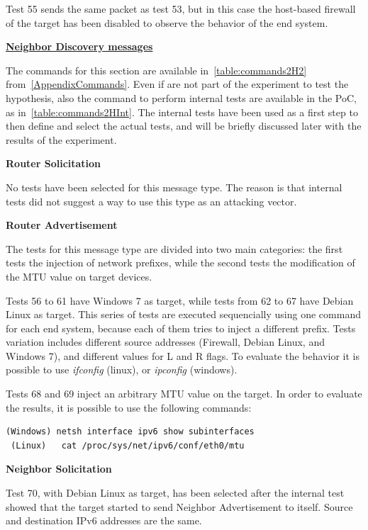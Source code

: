 \documentclass[12pt]{article}
\begin{document}
Test 55 sends the same packet as test 53, but in this case the host-based firewall of the target has been disabled to observe the behavior of the end system.


\textbf{\underline{Neighbor Discovery messages}}

The commands for this section are available in~\cref{table:commands2H2} from~\cref{AppendixCommands}. Even if are not part of the experiment to test the hypothesis, also the command to perform internal tests are available in the PoC, as in~\cref{table:commands2HInt}. The internal tests have been used as a first step to then define and select the actual tests, and will be briefly discussed later with the results of the experiment.

\textbf{Router Solicitation}

No tests have been selected for this message type. The reason is that internal tests did not suggest a way to use this type as an attacking vector.

\textbf{Router Advertisement}

The tests for this message type are divided into two main categories: the first tests the injection of network prefixes, while the second tests the modification of the MTU value on target devices. 

Tests 56 to 61 have Windows 7 as target, while tests from 62 to 67 have Debian Linux as target. This series of tests are executed sequencially using one command for each end system, because each of them tries to inject a different prefix. Tests variation includes different source addresses (Firewall, Debian Linux, and Windows 7), and different values for L and R flags. To evaluate the behavior it is possible to use \textit{ifconfig} (linux), or \textit{ipconfig} (windows).

Tests 68 and 69 inject an arbitrary MTU value on the target. In order to evaluate the results, it is possible to use the following commands:
\begin{lstlisting}[style=python,basicstyle=\ttfamily\small]
 (Windows) netsh interface ipv6 show subinterfaces
 (Linux)   cat /proc/sys/net/ipv6/conf/eth0/mtu
\end{lstlisting}


\textbf{Neighbor Solicitation}

Test 70, with Debian Linux as target, has been selected after the internal test showed that the target started to send Neighbor Advertisement to itself. Source and destination IPv6 addresses are the same.
\end{document}
